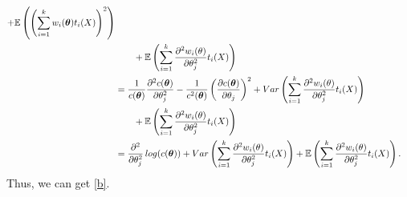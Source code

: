 \documentclass{article}
\begin{document}
\begin{CJK}{UTF8}{gbsn}
\begin{itemize}
\begin{align}
                  + \mathbb{E}\left (\left (\sum_{i=1}^kw_i(\boldsymbol{\theta})t_i(X) \right )^2\right )                                                                                                                         \notag                      \\
                    & \qquad + \mathbb{E}\left (\sum_{i=1}^k \frac{\partial^2 w_i(\boldmath\theta)}{\partial \theta_j^2} t_i(X) \right )                                                                                         \notag                       \\
                    & = \frac{1}{c(\boldsymbol{\theta})} \frac{\partial^2 c(\boldsymbol{\theta})}{\partial \theta_j^2}
                  - \frac{1}{c^2(\boldsymbol{\theta})} \left (\frac{\partial c(\boldsymbol{\theta})}{\partial \theta_j} \right )^2
                  + Var\left (\sum_{i=1}^k \frac{\partial^2 w_i(\boldmath\theta)}{\partial \theta_j^2} t_i(X) \right )                                                                                                          \notag                        \\
                    & \qquad + \mathbb{E}\left (\sum_{i=1}^k \frac{\partial^2 w_i(\boldmath\theta)}{\partial \theta_j^2} t_i(X) \right )                                                                                         \notag                       \\
                    & = \frac{\partial^2}{\partial \theta_j^2}\, log(c(\boldsymbol{\theta}))
                  + Var\left (\sum_{i=1}^k \frac{\partial^2 w_i(\boldmath\theta)}{\partial \theta_j^2} t_i(X) \right )
                  + \mathbb{E}\left (\sum_{i=1}^k \frac{\partial^2 w_i(\boldmath\theta)}{\partial \theta_j^2} t_i(X) \right ).\notag
              \end{align}
              Thus, we can get \eqref{b}.
    \end{itemize}



\end{CJK}
\end{document}
